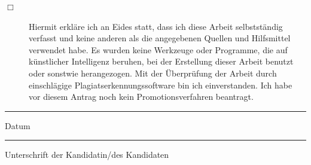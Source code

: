 
\clearpage 
\vspace*{8cm}
\begin{description} %
	

	\item[$\Box$] Hiermit erkläre ich an Eides statt, dass ich diese Arbeit selbstständig verfasst und keine anderen als die angegebenen Quellen und Hilfsmittel verwendet habe.
	Es wurden keine Werkzeuge oder Programme, die auf %
	künstlicher Intelligenz beruhen, bei der Erstellung dieser Arbeit benutzt
	oder sonstwie herangezogen. 
	Mit der Überprüfung der Arbeit durch einschlägige Plagiatserkennungssoftware bin ich einverstanden.
	Ich habe vor diesem Antrag noch kein Promotionsverfahren beantragt. \\
	
\end{description}






\vspace{3cm}

\begin{minipage}[t]{3cm}
	\rule{3cm}{0.5pt}
	Datum
\end{minipage}
\hfill
\begin{minipage}[t]{9cm}
	\rule{9cm}{0.5pt}
	Unterschrift der Kandidatin/des Kandidaten
\end{minipage}